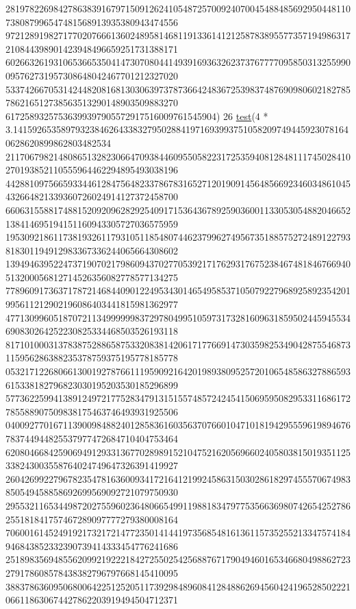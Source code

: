 \begin{DoxyCode}
      281978226984278638391679715091262410548725700924070045488485692950448110738087996547481568913935380943474556
      972128919827177020766613602489581468119133614121258783895577357194986317210844398901423948496659251731388171
      602663261931065366535041473070804414939169363262373767777095850313255990095762731957308648042467701212327020
      533742667053142448208168130306397378736642483672539837487690980602182785786216512738563513290148903509883270
      61725893257536399397905572917516009761545904)
26 \hyperlink{namespacetest_math_accae4d78fc0739220d35c06c2c0d5822}{test}(4 * 3.14159265358979323846264338327950288419716939937510582097494459230781640628620899862803482534
      211706798214808651328230664709384460955058223172535940812848111745028410270193852110555964462294895493038196
      442881097566593344612847564823378678316527120190914564856692346034861045432664821339360726024914127372458700
      660631558817488152092096282925409171536436789259036001133053054882046652138414695194151160943305727036575959
      195309218611738193261179310511854807446237996274956735188575272489122793818301194912983367336244065664308602
      139494639522473719070217986094370277053921717629317675238467481846766940513200056812714526356082778577134275
      778960917363717872146844090122495343014654958537105079227968925892354201995611212902196086403441815981362977
      477130996051870721134999999837297804995105973173281609631859502445945534690830264252230825334468503526193118
      817101000313783875288658753320838142061717766914730359825349042875546873115956286388235378759375195778185778
      053217122680661300192787661119590921642019893809525720106548586327886593615338182796823030195203530185296899
      577362259941389124972177528347913151557485724245415069595082953311686172785588907509838175463746493931925506
      040092770167113900984882401285836160356370766010471018194295559619894676783744944825537977472684710404753464
      620804668425906949129331367702898915210475216205696602405803815019351125338243003558764024749647326391419927
      260426992279678235478163600934172164121992458631503028618297455570674983850549458858692699569092721079750930
      295532116534498720275596023648066549911988183479775356636980742654252786255181841757467289097777279380008164
      706001614524919217321721477235014144197356854816136115735255213347574184946843852332390739414333454776241686
      251898356948556209921922218427255025425688767179049460165346680498862723279178608578438382796797668145410095
      388378636095068006422512520511739298489608412848862694560424196528502221066118630674427862203919494504712371

\end{DoxyCode}
